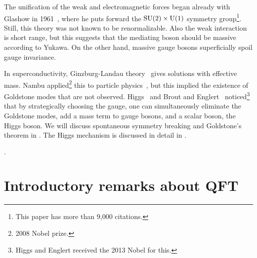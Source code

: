 The unification of the weak and electromagnetic forces began already with
Glashow in 1961~\cite{glashow_partial-symmetries_1961}, where
he puts forward the $\operatorname{SU}(2)\times \operatorname{U}(1)$ symmetry group\footnote{This
paper has more than 9,000 citations.}. Still, this theory was not known
to be renormalizable.
Also the weak interaction is short range, but this suggests that the mediating boson 
should be massive according to Yukawa. On the other hand, 
massive gauge bosons superficially spoil gauge invariance.

In superconductivity, Ginzburg-Landau theory~\cite{ginzburg_theory_1950}
gives solutions with effective mass. Nambu applied\footnote{2008 Nobel prize.} 
this to particle
physics~\cite{nambu_axial_1960,nambu_dynamical_1961,nambu_dynamical_1961-1},
but this implied the existence of Goldstone modes that are not observed.
Higgs~\cite{higgs_broken_1964} and Brout and Englert~\cite{englert_broken_1964}
noticed\footnote{Higgs and Englert received the 2013 Nobel for this.} 
that by strategically choosing 
the gauge, one can simultaneously
eliminate the Goldstone modes, add a mass term to gauge bosons, and a scalar
boson, the Higgs boson.
We will discuss spontaneous symmetry breaking and Goldstone's theorem
 in . The Higgs
mechanism is discussed in detail in .


\cite{aad_observation_2012,chatrchyan_observation_2012}.

\section{Introductory remarks about QFT} 

